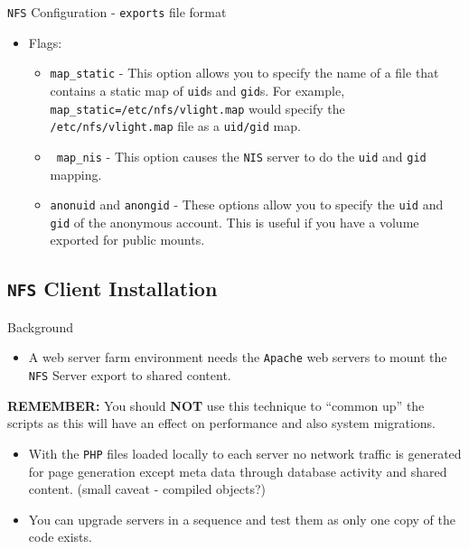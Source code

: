 \documentclass[xcolor=table,aspectratio=169]{beamer}
\begin{document}
\begin{frame}{\texttt{NFS} Configuration - \texttt{exports} file format}
  \begin{itemize}
    \item Flags:
      \begin{itemize}
        \item \texttt{map\_static} - This option allows you to specify the name of a file that contains a static map of \texttt{uid}s and \texttt{gid}s. For example, \texttt{map\_static=/etc/nfs/vlight.map} would specify the \texttt{/etc/nfs/vlight.map} file as a \texttt{uid/gid} map. 
        \item \texttt{ map\_nis} - This option causes the \texttt{NIS} server to do the \texttt{uid} and \texttt{gid} mapping.
        \item \texttt{anonuid} and \texttt{anongid} - These options allow you to specify the \texttt{uid} and \texttt{gid} of the anonymous account. This is useful if you have a volume exported for public mounts.
      \end{itemize}
  \end{itemize}
\end{frame}

\subsection{\texttt{NFS} Client Installation}
\begin{frame}{Background}
  \begin{itemize}
    \item A web server farm environment needs the \texttt{Apache} web servers to mount the \texttt{NFS} Server export to shared content.
  \end{itemize}
  \begin{tcolorbox}
      \noindent \scriptsize \textbf{REMEMBER:} You should \textbf{NOT} use this technique to ``common up'' the scripts as this will have an effect on performance and also system migrations.
      \begin{itemize}
        \item With the \texttt{PHP} files loaded locally to each server no network traffic is generated for page generation except meta data through database activity and shared content. (small caveat - compiled objects?)
        \item You can upgrade servers in a sequence and test them as only one copy of the code exists.
      \end{itemize}
  \end{tcolorbox}
\end{frame}
\end{document}
